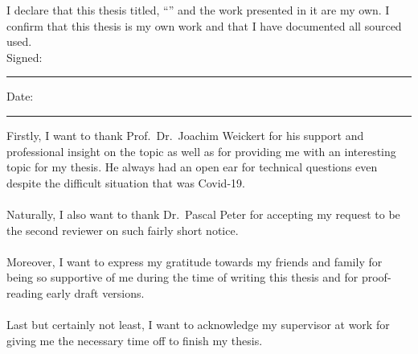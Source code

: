 \documentclass[
12pt, %
oneside, %
english, %
onehalfspacing, %
toctotoc, %
headsepline, %
chapterinoneline, %
]{MastersDoctoralThesis} %
\begin{document}

\begin{declaration}
    \noindent I declare that this thesis titled, \enquote{\ttitle} and the work 
    presented in it are my own. I confirm that this thesis is my own work and that I have
    documented all sourced used.\\

    \noindent Signed:\\
    \rule[0.5em]{25em}{0.5pt} %

    \noindent Date:\\
    \rule[0.5em]{25em}{0.5pt} %
\end{declaration}

\cleardoublepage

\begin{acknowledgements}
    \addchaptertocentry{\acknowledgementname}
    Firstly, I want to thank Prof.\ Dr.\ Joachim Weickert for his support and professional insight
    on the topic as well as for providing me with an interesting topic for my thesis. He always
    had an open ear for technical questions even despite the difficult situation that was
    Covid-19.\\
\\
    \noindent Naturally, I also want to thank Dr.\ Pascal Peter for accepting my
    request to be the second reviewer on such fairly short notice.\\
\\
    \noindent Moreover, I want to express my gratitude towards my friends and family for being 
    so supportive of me during the time of writing this thesis and for proof-reading early
    draft versions.\\
\\
    \noindent Last but certainly not least, I want to acknowledge my supervisor at work for 
    giving me the necessary time off to finish my thesis.
\end{acknowledgements}

\end{document}
